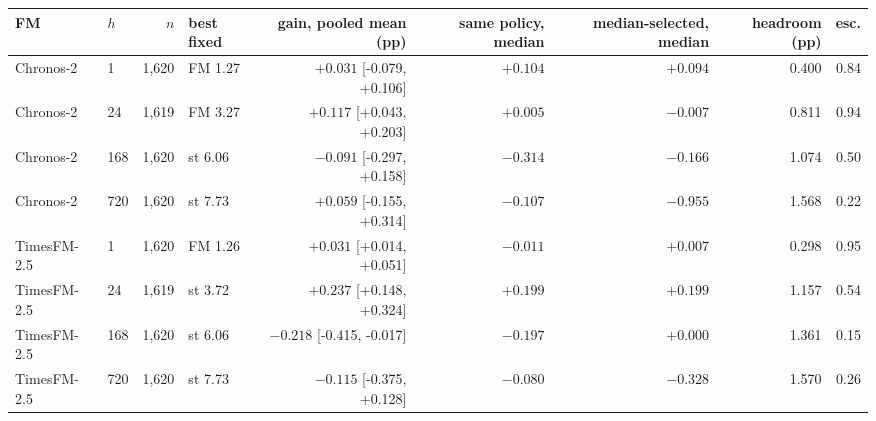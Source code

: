 \begin{tabular}{llrlrrrrr}
\toprule
FM & $h$ & $n$ & best fixed & gain, pooled mean (pp) & same policy, median & median-selected, median & headroom (pp) & esc. \\
\midrule
Chronos-2 & 1 & 1,620 & FM 1.27 & $+0.031$ [-0.079, +0.106] & $+0.104$ & $+0.094$ & 0.400 & 0.84 \\
Chronos-2 & 24 & 1,619 & FM 3.27 & $+0.117$ [+0.043, +0.203] & $+0.005$ & $-0.007$ & 0.811 & 0.94 \\
Chronos-2 & 168 & 1,620 & st 6.06 & $-0.091$ [-0.297, +0.158] & $-0.314$ & $-0.166$ & 1.074 & 0.50 \\
Chronos-2 & 720 & 1,620 & st 7.73 & $+0.059$ [-0.155, +0.314] & $-0.107$ & $-0.955$ & 1.568 & 0.22 \\
TimesFM-2.5 & 1 & 1,620 & FM 1.26 & $+0.031$ [+0.014, +0.051] & $-0.011$ & $+0.007$ & 0.298 & 0.95 \\
TimesFM-2.5 & 24 & 1,619 & st 3.72 & $+0.237$ [+0.148, +0.324] & $+0.199$ & $+0.199$ & 1.157 & 0.54 \\
TimesFM-2.5 & 168 & 1,620 & st 6.06 & $-0.218$ [-0.415, -0.017] & $-0.197$ & $+0.000$ & 1.361 & 0.15 \\
TimesFM-2.5 & 720 & 1,620 & st 7.73 & $-0.115$ [-0.375, +0.128] & $-0.080$ & $-0.328$ & 1.570 & 0.26 \\
\bottomrule
\end{tabular}
